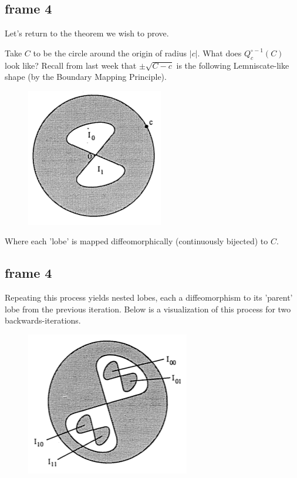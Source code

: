 \documentclass[xcolor=x11names,compress]{beamer}
\renewcommand{\(}{\begin{columns}}
\renewcommand{\)}{\end{columns}}
\newcommand{\<}[1]{\begin{column}{#1}}
\renewcommand{\>}{\end{column}}
\begin{document}
\subsection{frame 4}
\begin{frame}

Let's return to the theorem we wish to prove. 

\vspace{.4cm}
\pause


Take $C$ to be the circle around the origin of radius $|c|$. What does $Q^{\circ -1}_c(C)$ look like? Recall from last week that $\pm \sqrt{C - c}$ is the following Lemniscate-like shape (by the Boundary Mapping Principle).


\begin{figure}
\includegraphics[scale=.4]{lobes1.png}
\end{figure}

\pause

Where each 'lobe' is mapped diffeomorphically (continuously bijected) to $C$.

\end{frame}


\subsection{frame 4}
\begin{frame}

Repeating this process yields nested lobes, each a diffeomorphism to its 'parent' lobe from the previous iteration. Below is a visualization of this process for two backwards-iterations.

\pause

\begin{figure}
\includegraphics[scale=.4]{lobes2.png}
\end{figure}

\end{frame}
\end{document}
